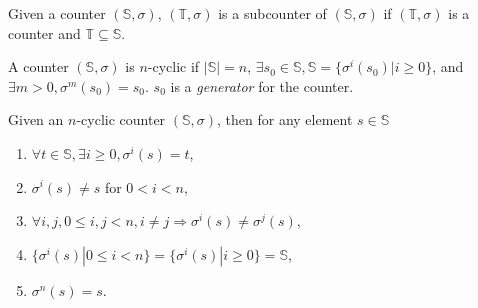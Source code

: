 \documentclass[5p, twocolumn]{elsarticle}
\begin{document}
\begin{definition}
Given a counter $(\mathbb{S},\sigma)$, $(\mathbb{T},\sigma)$ is a subcounter of $(\mathbb{S},\sigma)$ if $(\mathbb{T},\sigma)$ is a counter and $\mathbb{T}\subseteq\mathbb{S}$.
\end{definition}

\begin{definition}
A counter $(\mathbb{S},\sigma)$ is $n$-cyclic if $|\mathbb{S}|=n$, $\exists s_0\in\mathbb{S}, \mathbb{S}=\{\sigma^i(s_0)|i\geq 0\}$, and $\exists m>0, \sigma^m(s_0)=s_0$. $s_0$ is a \emph{generator} for the counter.
\end{definition}

\begin{lemma}
Given an $n$-cyclic counter $(\mathbb{S},\sigma)$, then for any element $s\in\mathbb{S}$
\begin{enumerate}
\item $\forall t\in\mathbb{S}, \exists i\geq0, \sigma^i(s)=t$,
\item $\sigma^i(s)\neq s$ for $0<i<n$,
\item $\forall i,j, 0\leq i,j<n, i\neq j\Rightarrow \sigma^i(s)\neq\sigma^j(s)$,
\item $\{\sigma^i(s)|0\leq i<n\}=\{\sigma^i(s)|i\geq 0\}=\mathbb{S}$,
\item $\sigma^n(s)=s$.
\end{enumerate}
\label{lemma_cycle_full}
\end{lemma}
\end{document}
